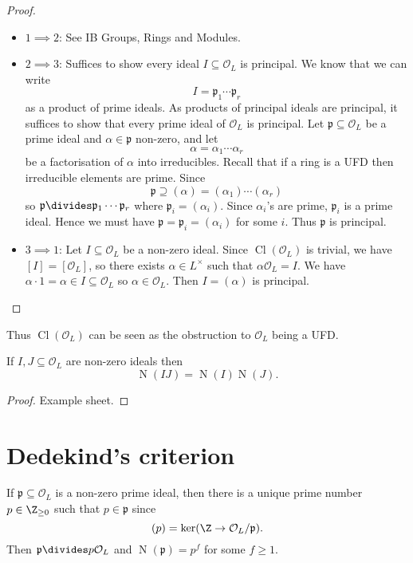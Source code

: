 \documentclass[a4paper]{article}
\renewcommand*{\O}{\mathcal{O}}
\DeclareMathOperator{\n}{N}
\DeclareMathOperator{\Cl}{Cl}%
\begin{document}
\begin{proof}\leavevmode
  \begin{itemize}
  \item \(1 \implies 2\): See IB Groups, Rings and Modules.
  \item \(2 \implies 3\): Suffices to show every ideal \(I \subseteq \O_L\) is principal. We know that we can write
    \[
      I = \mathfrak{p}_1 \cdots \mathfrak{p}_r
    \]
    as a product of prime ideals. As products of principal ideals are principal, it suffices to show that every prime ideal of \(\O_L\) is principal. Let \(\mathfrak{p} \subseteq \O_L\) be a prime ideal and \(\alpha \in \mathfrak{p}\) non-zero, and let
    \[
      \alpha = \alpha_1 \cdots \alpha_r
    \]
    be a factorisation of \(\alpha\) into irreducibles. Recall that if a ring is a UFD then irreducible elements are prime. Since
    \[
      \mathfrak{p} \supseteq (\alpha) = (\alpha_1) \cdots (\alpha_r)
    \]
    so \(\mathfrak{p} \divides \mathfrak{p}_1 \cdots \mathfrak{p}_r\) where \(\mathfrak{p}_i = (\alpha_i)\). Since \(\alpha_i\)'s are prime, \(\mathfrak{p}_i\) is a prime ideal. Hence we must have \(\mathfrak{p} = \mathfrak{p}_i = (\alpha_i)\) for some \(i\). Thus \(\mathfrak{p}\) is principal.
  \item \(3 \implies 1\): Let \(I \subseteq \O_L\) be a non-zero ideal. Since \(\Cl(\O_L)\) is trivial, we have \([I] = [\O_L]\), so there exists \(\alpha \in L^\times\) such that \(\alpha \O_L = I\). We have \(\alpha \cdot 1 = \alpha \in I \subseteq \O_L\) so \(\alpha \in \O_L\). Then \(I = (\alpha)\) is principal.
  \end{itemize}
\end{proof}

Thus \(\Cl(\O_L)\) can be seen as the obstruction to \(\O_L\) being a UFD.

\begin{lemma}
  If \(I, J \subseteq \O_L\) are non-zero ideals then
  \[
    \n(IJ) = \n(I)\n(J).
  \]
\end{lemma}

\begin{proof}
  Example sheet.
\end{proof}

\section{Dedekind's criterion}

If \(\mathfrak{p} \subseteq \O_L\) is a non-zero prime ideal, then there is a unique prime number \(p \in \Z_{\geq 0}\) such that \(p \in \mathfrak{p}\) since
\[
  (p) = \ker (\Z \to \O_L/\mathfrak{p}).
\]
Then \(\mathfrak p \divides p \O_L\) and \(\n(\mathfrak p) = p^f\) for some \(f \geq 1\).
\end{document}

